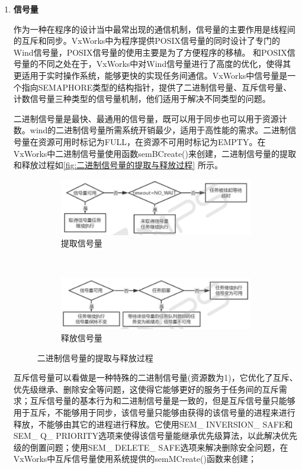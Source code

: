 \begin{enumerate}
	\item \textbf{信号量}
	
	作为一种在程序的设计当中最常出现的通信机制，信号量的主要作用是线程间的互斥和同步。VxWorks中为程序提供POSIX信号量的同时设计了专门的Wind信号量，POSIX信号量的使用主要是为了方便程序的移植。
	和POSIX信号量的不同之处在于，VxWorks中对Wind信号量进行了高度的优化，使得其更适用于实时操作系统，能够更快的实现任务间通信。VxWorks中信号量是一个指向SEMAPHORE类型的结构指针，提供了二进制信号量、互斥信号量、计数信号量三种类型的信号量机制，他们适用于解决不同类型的问题。
	
	二进制信号量是最快、最通用的信号量，既可以用于同步也可以用于资源计数。wind的二进制信号量所需系统开销最少，适用于高性能的需求。二进制信号量在资源可用时标记为FULL，在资源不可用时标记为EMPTY。在VxWorks中二进制信号量使用函数semBCreate()来创建，二进制信号量的提取和释放过程如\autoref{fig:二进制信号量的提取与释放过程} 所示。

\begin{figure}[h]
\centering
  \begin{subfigure}[b]{1.0\textwidth}
  \includegraphics[width=\textwidth]{./graphics/erjinzhiTiQu.pdf}
  \caption{提取信号量}\label{fig:cp2102Front}
  \end{subfigure}
  ~
  \begin{subfigure}[b]{1.0\textwidth}
  \includegraphics[width=\textwidth]{./graphics/erjinzhiShiFang.pdf}
  \caption{释放信号量}\label{fig:cp2102Rear}
  \end{subfigure}
\caption{二进制信号量的提取与释放过程}\label{fig:二进制信号量的提取与释放过程}
\end{figure}

	
	互斥信号量可以看做是一种特殊的二进制信号量(资源数为1)，它优化了互斥、优先级继承、删除安全等问题，这使得它能够更好的服务于任务间的互斥需求；互斥信号量的基本行为和二进制信号量是一致的，但是互斥信号量只能够用于互斥，不能够用于同步，该信号量只能够由获得的该信号量的进程来进行释放，不能够由其它的进程进行释放。它使用SEM\_ INVERSION\_ SAFE和SEM\_ Q\_ PRIORITY选项来使得该信号量能继承优先级算法，以此解决优先级的倒置问题；使用SEM\_ DELETE\_ SAFE选项来解决删除安全问题，在VxWorks中互斥信号量使用系统提供的semMCreate()函数来创建；
	

\end{enumerate}
